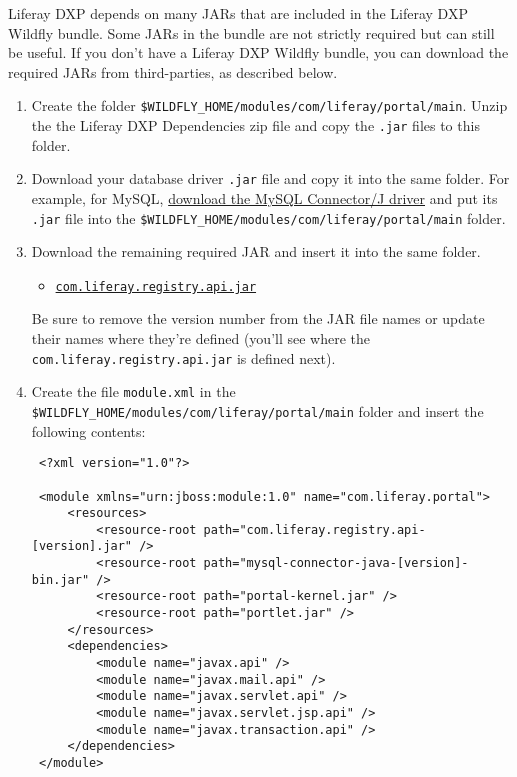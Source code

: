 Liferay DXP depends on many JARs that are included in the Liferay DXP
Wildfly bundle. Some JARs in the bundle are not strictly required but
can still be useful. If you don't have a Liferay DXP Wildfly bundle, you
can download the required JARs from third-parties, as described below.

\begin{enumerate}
\def\labelenumi{\arabic{enumi}.}
\item
  Create the folder
  \texttt{\$WILDFLY\_HOME/modules/com/liferay/portal/main}. Unzip the
  the Liferay DXP Dependencies zip file and copy the \texttt{.jar} files
  to this folder.
\item
  Download your database driver \texttt{.jar} file and copy it into the
  same folder. For example, for MySQL,
  \href{http://dev.mysql.com/downloads/connector/j/}{download the MySQL
  Connector/J driver} and put its \texttt{.jar} file into the
  \texttt{\$WILDFLY\_HOME/modules/com/liferay/portal/main} folder.
\item
  Download the remaining required JAR and insert it into the same
  folder.

  \begin{itemize}
  \tightlist
  \item
    \href{https://repository.liferay.com/nexus/content/repositories/liferay-public-releases/com/liferay/com.liferay.registry.api}{\texttt{com.liferay.registry.api.jar}}
  \end{itemize}

  Be sure to remove the version number from the JAR file names or update
  their names where they're defined (you'll see where the
  \texttt{com.liferay.registry.api.jar} is defined next).
\item
  Create the file \texttt{module.xml} in the
  \texttt{\$WILDFLY\_HOME/modules/com/liferay/portal/main} folder and
  insert the following contents:

\begin{verbatim}
 <?xml version="1.0"?>

 <module xmlns="urn:jboss:module:1.0" name="com.liferay.portal">
     <resources>
         <resource-root path="com.liferay.registry.api-[version].jar" />
         <resource-root path="mysql-connector-java-[version]-bin.jar" />
         <resource-root path="portal-kernel.jar" />
         <resource-root path="portlet.jar" />
     </resources>
     <dependencies>
         <module name="javax.api" />
         <module name="javax.mail.api" />
         <module name="javax.servlet.api" />
         <module name="javax.servlet.jsp.api" />
         <module name="javax.transaction.api" />
     </dependencies>
 </module>
\end{verbatim}


\end{enumerate}
